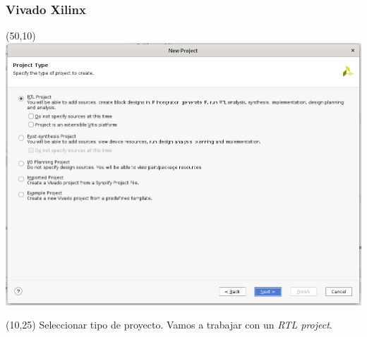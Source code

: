 \documentclass[aspectratio=169]{beamer}
\begin{document}
\begin{frame}[fragile,t]
    \frametitle{Vivado Xilinx}
    \begin{textblock}{75}(50,10) \includegraphics[scale=0.27]{img/vivado/03_proyect_type.png} \end{textblock}
    \begin{textblock}{38}(10,25) \small
    Seleccionar tipo de proyecto. Vamos a trabajar con un \emph{RTL project}.
    \end{textblock}
\end{frame}
    
\end{document}
